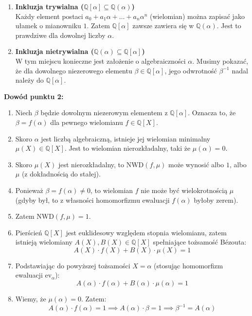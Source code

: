 \begin{enumerate}
    \item \textbf{Inkluzja trywialna ($\mathbb{Q}[\alpha] \subseteq \mathbb{Q}(\alpha)$)} \\
    Każdy element postaci $a_0 + a_1\alpha + \dots + a_n\alpha^n$ (wielomian) można zapisać jako ułamek o mianowniku $1$. Zatem $\mathbb{Q}[\alpha]$ zawsze zawiera się w $\mathbb{Q}(\alpha)$. Jest to prawdziwe dla dowolnej liczby $\alpha$.

    \item \textbf{Inkluzja nietrywialna ($\mathbb{Q}(\alpha) \subseteq \mathbb{Q}[\alpha]$)} \\
    W tym miejscu konieczne jest założenie o algebraiczności $\alpha$. Musimy pokazać, że dla dowolnego niezerowego elementu $\beta \in \mathbb{Q}[\alpha]$, jego odwrotność $\beta^{-1}$ nadal należy do $\mathbb{Q}[\alpha]$.
\end{enumerate}

\textbf{Dowód punktu 2:}
\begin{enumerate}[label=\roman*)]
    \item Niech $\beta$ będzie dowolnym niezerowym elementem z $\mathbb{Q}[\alpha]$. Oznacza to, że $\beta = f(\alpha)$ dla pewnego wielomianu $f \in \mathbb{Q}[X]$.
    \item Skoro $\alpha$ jest liczbą algebraiczną, istnieje jej wielomian minimalny $\mu(X) \in \mathbb{Q}[X]$. Jest to wielomian nierozkładalny, taki że $\mu(\alpha) = 0$.
    \item Skoro $\mu(X)$ jest nierozkładalny, to $\text{NWD}(f, \mu)$ może wynosić albo $1$, albo $\mu$ (z dokładnością do stałej).
    \item Ponieważ $\beta = f(\alpha) \neq 0$, to wielomian $f$ nie może być wielokrotnością $\mu$ (gdyby był, to z własności homomorfizmu ewaluacji $f(\alpha)$ byłoby zerem).
    \item Zatem $\text{NWD}(f, \mu) = 1$.
    \item Pierścień $\mathbb{Q}[X]$ jest euklidesowy względem stopnia wielomianu, zatem istnieją wielomiany $A(X), B(X) \in \mathbb{Q}[X]$ spełniające tożsamość Bézouta:
    \[ A(X) \cdot f(X) + B(X) \cdot \mu(X) = 1 \]
    \item Podstawiając do powyższej tożsamości $X = \alpha$ (stosując homomorfizm ewaluacji $\text{ev}_{\alpha}$):
    \[ A(\alpha) \cdot f(\alpha) + B(\alpha) \cdot \mu(\alpha) = 1 \]
    \item Wiemy, że $\mu(\alpha) = 0$. Zatem:
    \[ A(\alpha) \cdot f(\alpha) = 1 \implies A(\alpha) \cdot \beta = 1 \implies \beta^{-1} = A(\alpha) \]
\end{enumerate}

